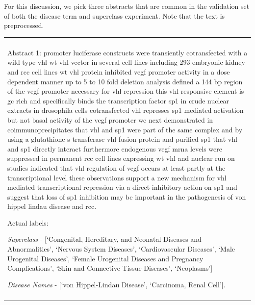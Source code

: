 For this discussion, we pick three abstracts that are common in the validation set of both the disease term and superclass experiment. Note that the text is preprocessed. 

\newenvironment{boxet}
    {\begin{center}
    \begin{tabular}{|p{0.9\textwidth}|}
    \hline\\
    }
    { 
    \\\\\hline
    \end{tabular} 
    \end{center}
    }
\begin{boxet}
Abstract 1: \textsf{promoter luciferase constructs were transiently cotransfected with a wild type vhl wt vhl vector in several cell lines including 293 embryonic kidney and rcc cell lines wt vhl protein inhibited vegf promoter activity in a dose dependent manner up to 5 to 10 fold deletion analysis defined a 144 bp region of the vegf promoter necessary for vhl repression this vhl responsive element is gc rich and specifically binds the transcription factor sp1 in crude nuclear extracts in drosophila cells cotransfected vhl represses sp1 mediated activation but not basal activity of the vegf promoter we next demonstrated in coimmunoprecipitates that vhl and sp1 were part of the same complex and by using a glutathione s transferase vhl fusion protein and purified sp1 that vhl and sp1 directly interact furthermore endogenous vegf mrna levels were suppressed in permanent rcc cell lines expressing wt vhl and nuclear run on studies indicated that vhl regulation of vegf occurs at least partly at the transcriptional level these observations support a new mechanism for vhl mediated transcriptional repression via a direct inhibitory action on sp1 and suggest that loss of sp1 inhibition may be important in the pathogenesis of von hippel lindau disease and rcc.}

Actual labels: 

\emph{Superclass} - [`Congenital, Hereditary, and Neonatal Diseases and Abnormalities', `Nervous System Diseases', `Cardiovascular Diseases', `Male Urogenital Diseases', `Female Urogenital Diseases and Pregnancy Complications', `Skin and Connective Tissue Diseases', `Neoplasms']

\emph{Disease Names} - [`von Hippel-Lindau Disease', `Carcinoma, Renal Cell'].
\end{boxet}
